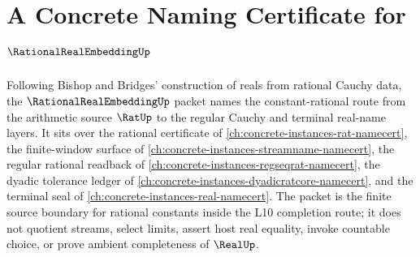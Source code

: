 \chapter{A Concrete Naming Certificate for $\RationalRealEmbeddingUp$}
\label{ch:concrete-instances-rational-real-embedding-namecert}

Following Bishop and Bridges' construction of reals from rational Cauchy data, the $\RationalRealEmbeddingUp$ packet names the constant-rational route from the arithmetic source $\RatUp$ to the regular Cauchy and terminal real-name layers. It sits over the rational certificate of \autoref{ch:concrete-instances-rat-namecert}, the finite-window surface of \autoref{ch:concrete-instances-streamname-namecert}, the regular rational readback of \autoref{ch:concrete-instances-regseqrat-namecert}, the dyadic tolerance ledger of \autoref{ch:concrete-instances-dyadicratcore-namecert}, and the terminal seal of \autoref{ch:concrete-instances-real-namecert}. The packet is the finite source boundary for rational constants inside the L10 completion route; it does not quotient streams, select limits, assert host real equality, invoke countable choice, or prove ambient completeness of $\RealUp$.

